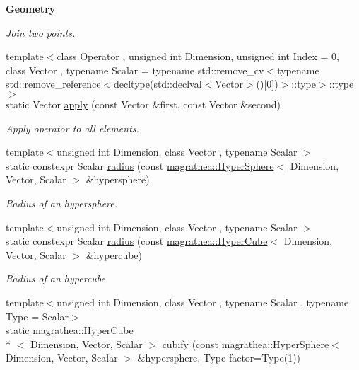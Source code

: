 \begin{Indent}{\bf Geometry}
\begin{DoxyCompactItemize}
\begin{DoxyCompactList}\small\item\em Join two points. \end{DoxyCompactList}\item 
{\footnotesize template$<$class Operator , unsigned int Dimension, unsigned int Index = 0, class Vector , typename Scalar  = typename std\-::remove\-\_\-cv$<$typename std\-::remove\-\_\-reference$<$decltype(std\-::declval$<$\-Vector$>$()\mbox{[}0\mbox{]})$>$\-::type$>$\-::type$>$ }\\static Vector \hyperlink{exceptionUtility_a7982ba3fafc912d50e00d2fd6d470d42}{apply} (const Vector \&first, const Vector \&second)
\begin{DoxyCompactList}\small\item\em Apply operator to all elements. \end{DoxyCompactList}\item 
{\footnotesize template$<$unsigned int Dimension, class Vector , typename Scalar $>$ }\\static constexpr Scalar \hyperlink{exceptionUtility_ac0c6a5f0453a9599554949f06a8d116e}{radius} (const \hyperlink{exceptionmagrathea_1_1HyperSphere}{magrathea\-::\-Hyper\-Sphere}$<$ Dimension, Vector, Scalar $>$ \&hypersphere)
\begin{DoxyCompactList}\small\item\em Radius of an hypersphere. \end{DoxyCompactList}\item 
{\footnotesize template$<$unsigned int Dimension, class Vector , typename Scalar $>$ }\\static constexpr Scalar \hyperlink{exceptionUtility_a64d223d506b4a5ab47a3e087412c5840}{radius} (const \hyperlink{exceptionmagrathea_1_1HyperCube}{magrathea\-::\-Hyper\-Cube}$<$ Dimension, Vector, Scalar $>$ \&hypercube)
\begin{DoxyCompactList}\small\item\em Radius of an hypercube. \end{DoxyCompactList}\item 
{\footnotesize template$<$unsigned int Dimension, class Vector , typename Scalar , typename Type  = Scalar$>$ }\\static \hyperlink{exceptionmagrathea_1_1HyperCube}{magrathea\-::\-Hyper\-Cube}\\*
$<$ Dimension, Vector, Scalar $>$ \hyperlink{exceptionUtility_af3e3b0d101940f485211b1a8736c5f7e}{cubify} (const \hyperlink{exceptionmagrathea_1_1HyperSphere}{magrathea\-::\-Hyper\-Sphere}$<$ Dimension, Vector, Scalar $>$ \&hypersphere, Type factor=Type(1))

\end{DoxyCompactItemize}
\end{Indent}
